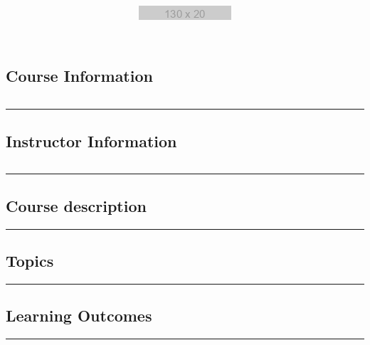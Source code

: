\documentclass[11pt]{handout}
\title{\includegraphics[scale=1.0]{assets/logo.png}}
\begin{document}
\maketitle


  \subsection*{Course Information}
  \vspace{0ex}%
  \noindent\parbox{0.5\textwidth}{%
  \noindent\begin{tabular}{@{}ll}
  
  \end{tabular}}
  \vspace{2ex}\hrule\vspace{2ex}


  \subsection*{Instructor Information}
  \noindent\parbox{0.5\textwidth}{%
  \noindent\begin{tabular}{@{}ll}
  
  \end{tabular}}
  \vspace{2ex}\hrule\vspace{2ex}

 
  \subsection*{Course description} 
  
  \vspace{2ex} \hrule\vspace{2ex}
 
 
  \subsection*{Topics} 
  
  \vspace{2ex} \hrule\vspace{2ex}
 

  \subsection*{Learning Outcomes}
  
  \vspace{2ex}\hrule\vspace{2ex}
\end{document}
